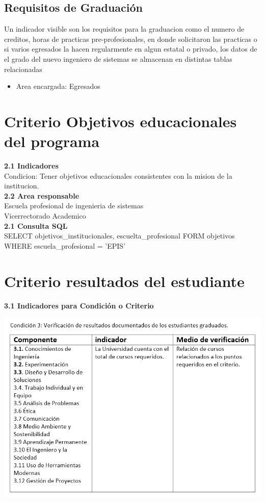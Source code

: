 \documentclass[12pt,a4paper]{report}
\begin{document}
\subsection{Requisitos de Graduación}
Un indicador visible son los requisitos para la graduacion como el numero de creditos, horas de practicas pre-profesionales, en donde solicitaron las practicas o si varios egresados la hacen regularmente en algun estatal o privado, los datos de el grado del nuevo ingeniero de sistemas se almacenan en distintas tablas relacionadas
\begin{itemize}
\item Area encargada: Egresados

\end{itemize}

\section{ Criterio Objetivos educacionales del programa}
\textbf{2.1 Indicadores }\\

Condicion: Tener objetivos educacionales consistentes con la mision de la institucion.\\

\textbf{2.2 Area responsable}\\

Escuela profesional de ingenieria de sistemas\\
Vicerrectorado Academico\\

\textbf{2.1 Consulta SQL}\\

SELECT objetivos\_institucionales, escuelta\_profesional FORM objetivos WHERE escuela\_profesional = 'EPIS'

\section{ Criterio resultados del estudiante}
\textbf{3.1 Indicadores para Condición o Criterio}
\begin{center}
\includegraphics[width=15cm]{./Images/resultado}
\end{center}	
\end{document}
